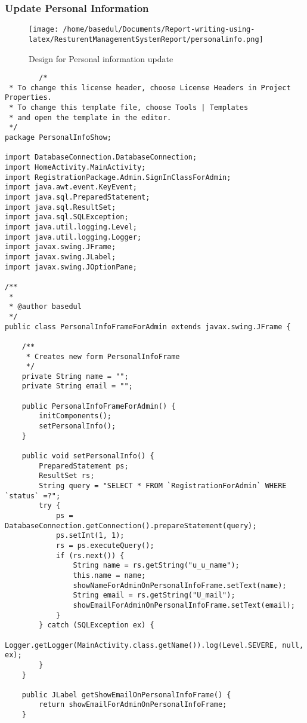 \documentclass[12pt,a4paper]{article}
\begin{document}
	\subsubsection{Update Personal Information}
		\begin{figure}[H]
		\centering
		\texttt{[image: /home/basedul/Documents/Report-writing-using-latex/ResturentManagementSystemReport/personalinfo.png]}
		\caption{Design for Personal information update}
		\label{fig:personalinfo} 
\end{figure}
	\begin{lstlisting}
		/*
 * To change this license header, choose License Headers in Project Properties.
 * To change this template file, choose Tools | Templates
 * and open the template in the editor.
 */
package PersonalInfoShow;

import DatabaseConnection.DatabaseConnection;
import HomeActivity.MainActivity;
import RegistrationPackage.Admin.SignInClassForAdmin;
import java.awt.event.KeyEvent;
import java.sql.PreparedStatement;
import java.sql.ResultSet;
import java.sql.SQLException;
import java.util.logging.Level;
import java.util.logging.Logger;
import javax.swing.JFrame;
import javax.swing.JLabel;
import javax.swing.JOptionPane;

/**
 *
 * @author basedul
 */
public class PersonalInfoFrameForAdmin extends javax.swing.JFrame {

    /**
     * Creates new form PersonalInfoFrame
     */
    private String name = "";
    private String email = "";

    public PersonalInfoFrameForAdmin() {
        initComponents();
        setPersonalInfo();
    }

    public void setPersonalInfo() {
        PreparedStatement ps;
        ResultSet rs;
        String query = "SELECT * FROM `RegistrationForAdmin` WHERE `status` =?";
        try {
            ps = DatabaseConnection.getConnection().prepareStatement(query);
            ps.setInt(1, 1);
            rs = ps.executeQuery();
            if (rs.next()) {
                String name = rs.getString("u_u_name");
                this.name = name;
                showNameForAdminOnPersonalInfoFrame.setText(name);
                String email = rs.getString("U_mail");
                showEmailForAdminOnPersonalInfoFrame.setText(email);
            }
        } catch (SQLException ex) {
            Logger.getLogger(MainActivity.class.getName()).log(Level.SEVERE, null, ex);
        }
    }

    public JLabel getShowEmailOnPersonalInfoFrame() {
        return showEmailForAdminOnPersonalInfoFrame;
    }


\end{lstlisting}
\end{document}
